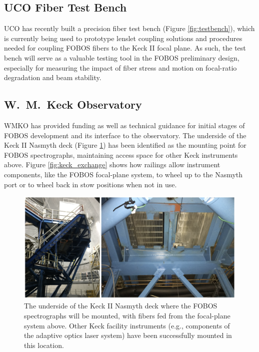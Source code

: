 \documentclass[oneside,11pt]{amsart}
\begin{document}
\subsection{UCO Fiber Test Bench}

UCO has recently built a precision fiber test bench (Figure
\ref{fig:testbench}), which is currently being used to prototype lenslet
coupling solutions and procedures needed for coupling FOBOS fibers to
the Keck II focal plane.  As such, the test bench will serve as a
valuable testing tool in the FOBOS preliminary design, especially for
measuring the impact of fiber stress and motion on focal-ratio
degradation and beam stability.

\subsection{W.~M.~Keck Observatory}

WMKO has provided funding as well as technical guidance for initial
stages of FOBOS development and its interface to the observatory.  The
underside of the Keck II Nasmyth deck (Figure \ref{fig:nasmyth_mount})
has been identified as the mounting point for FOBOS spectrographs,
maintaining access space for other Keck instruments above.  Figure
\ref{fig:keck_exchange} shows how railings allow instrument components,
like the FOBOS focal-plane system, to wheel up to the Nasmyth port or to
wheel back in stow positions when not in use.

\begin{figure}[h!]
%
\vskip -0.1in
%
\includegraphics[width=\textwidth]{figs/nasmyth_deck.png}
%
\caption{\small The underside of the Keck II Nasmyth deck where the
FOBOS spectrographs will be mounted, with fibers fed from the
focal-plane system above.  Other Keck facility instruments (e.g.,
components of the adaptive optics laser system) have been successfully
mounted in this location.}
%
\label{fig:nasmyth_mount}
%
\end{figure}
\end{document}
